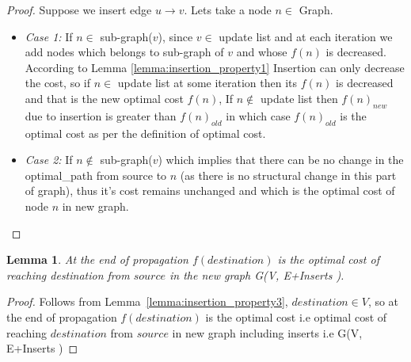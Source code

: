 \documentclass[a4paper]{article}
\newtheorem{lemma}[theorem]{Lemma}
\begin{document}
\begin{proof}
  Suppose we insert edge $u \rightarrow v$. Lets take a node $n \in$ Graph.
\begin{itemize}[label={}]
    \item \textit{Case 1:} If $n \in$ sub-graph($v$), since $v \in$ update list and at each iteration we add nodes which belongs to sub-graph of $v$ and whose $f(n)$ is decreased. According to Lemma \ref{lemma:insertion_property1} Insertion can only decrease the cost, so if $n \in$ update list at some iteration then its $f(n)$ is decreased and that is the new optimal cost $f(n)$, If $n \notin$ update list then $f(n)_{new}$ due to insertion is greater than $f(n)_{old}$ in which case $f(n)_{old}$ is the optimal cost as per the definition of optimal cost.
    \item \textit{Case 2:} If $n \notin$ sub-graph($v$) which implies that there can be no change in the optimal\_path from source to $n$ (as there is no structural change in this part of graph), thus it's cost remains unchanged and which is the optimal cost of node $n$ in new graph.
\end{itemize}
\end{proof}
\begin{lemma}\label{lemma:insertion_property4}
At the end of propagation $f(destination)$ is the optimal cost of reaching destination from $source$ in the new graph G(V, E+Inserts ).
\end{lemma}
\begin{proof}
  Follows from Lemma~\ref{lemma:insertion_property3}, $destination \in V$, so at the end of propagation $f(destination)$ is the optimal cost i.e optimal cost of reaching $destination$ from $source$ in new graph including inserts i.e G(V, E+Inserts )
\end{proof}
\end{document}
